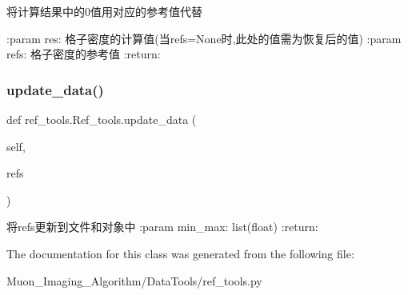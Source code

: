 \begin{DoxyVerb}将计算结果中的0值用对应的参考值代替

:param res: 格子密度的计算值(当refs=None时,此处的值需为恢复后的值)
:param refs: 格子密度的参考值
:return:
\end{DoxyVerb}
 \mbox{\label{classref__tools_1_1Ref__tools_a731f453d656a7b60f0cb0581c2e34614}} 
\subsubsection{\texorpdfstring{update\+\_\+data()}{update\_data()}}
{\footnotesize\ttfamily def ref\+\_\+tools.\+Ref\+\_\+tools.\+update\+\_\+data (\begin{DoxyParamCaption}\item[{}]{self,  }\item[{}]{refs }\end{DoxyParamCaption})}

\begin{DoxyVerb}将refs更新到文件和对象中
:param min_max: list(float)
:return:
\end{DoxyVerb}
 

The documentation for this class was generated from the following file\+:\begin{DoxyCompactItemize}
\item 
Muon\+\_\+\+Imaging\+\_\+\+Algorithm/\+Data\+Tools/ref\+\_\+tools.\+py\end{DoxyCompactItemize}
